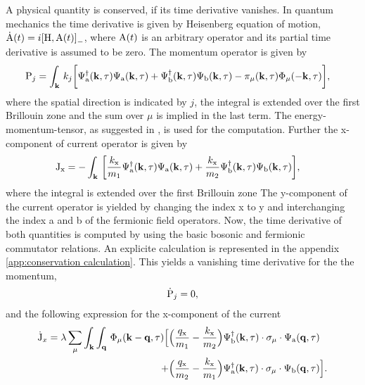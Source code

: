A physical quantity is conserved, if its time derivative vanishes.
In quantum mechanics the time derivative is given by Heisenberg equation of motion, $\dot{\mt{A}}(t) = i\comm{\mt{H}}{\mt{A}(t)}_{-}$, where $\mathrm{A}(t)$ is an arbitrary operator and its partial time derivative is assumed to be zero.
The momentum operator is given by 
%
\begin{align}
	\mathrm{P}_{j} &= \int_{\vb{k}}\, 
		k_{j}\bigg[
	 		\Psi_{\mathrm{a}}^{\dag}(\vb{k},\tau) \Psi_{\mathrm{a}}(\vb{k},\tau)
	 		+
	 		\Psi_{\mathrm{b}}^{\dag}(\vb{k},\tau) \Psi_{\mathrm{b}}(\vb{k},\tau)
	 		-
	 		\pi_{\mu}(\vb{k},\tau) \Phi_{\mu}(-\vb{k},\tau)
		\bigg],
		\label{eq:momentum operator}
\end{align}
%
where the spatial direction is indicated by $j$, the integral is extended over the first Brillouin zone and the sum over $\mu$ is implied in the last term.
The energy-momentum-tensor, as suggested in \cite{Iliev}, is used for the computation.
Further the x-component of current operator is given by
%
\begin{align}
	\mathrm{J}_{\mathrm{x}} &= - \int_{\vb{k}}\, \bigg[
		\frac{k_{\mathrm{x}}}{m_{1}} \Psi_{\mathrm{a}}^{\dag}(\vb{k},\tau) \Psi_{\mathrm{a}}(\vb{k},\tau)
		+ 
		\frac{k_{\mathrm{x}}}{m_{2}} \Psi_{\mathrm{b}}^{\dag}(\vb{k},\tau) \Psi_{\mathrm{b}}(\vb{k},\tau)
	\bigg],
	\label{eq:current operator}
\end{align}
%
where the integral is extended over the first Brillouin zone
The y-component of the current operator is yielded by changing the index x to y and interchanging the index a and b of the fermionic field operators.
Now, the time derivative of both quantities is computed by using the basic bosonic and fermionic commutator relations.
An explicite calculation is represented in the appendix \ref{app:conservation calculation}.
This yields a vanishing time derivative for the the momentum,
%
\begin{align}
	\dot{\mathrm{P}}_{j} = 0,
	\label{eq:time derivative momentum}
\end{align}
%
and the following expression for the x-component of the current
%
\begin{align}
	\dot{\mathrm{J}}_{x} = \lambda
		\sum\limits_{\mu} \int_{\vb{k}} \int_{\vb{q}}\,
		\Phi_{\mu}(\vb{k}-\vb{q},\tau)
		\Big[
			&\Big(\frac{q_{\mathrm{x}}}{m_{1}} - \frac{k_{\mathrm{x}}}{m_{2}}\Big)
			\Psi_{\mathrm{b}}^{\dag}(\vb{k},\tau) \cdot \sigma_{\mu} \cdot \Psi_{\mathrm{a}}(\vb{q},\tau)
			\notag \\+
			&\Big(\frac{q_{\mathrm{x}}}{m_{2}} - \frac{k_{\mathrm{x}}}{m_{1}}\Big)
			\Psi_{\mathrm{a}}^{\dag}(\vb{k},\tau) \cdot \sigma_{\mu} \cdot \Psi_{\mathrm{b}}(\vb{q},\tau)
		\Big].
		\label{eq:time derivative current}
\end{align}
